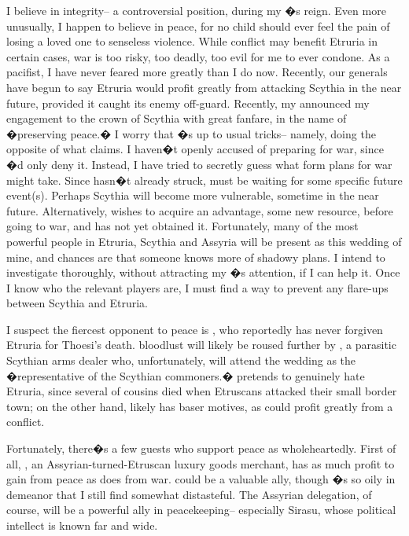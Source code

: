 \documentclass[char]{Kos}
\begin{document}
I believe in integrity-- a controversial position, during my \cEtruriaKing{\parent}�s reign. Even more unusually, I happen to believe in peace, for no child should ever feel the pain of losing a loved one to senseless violence. While conflict may benefit Etruria in certain cases, war is too risky, too deadly, too evil for me to ever condone. As a pacifist, I have never feared more greatly than I do now. Recently, our generals have begun to say Etruria would profit greatly from attacking Scythia in the near future, provided it caught its enemy off-guard. Recently, my \cEtruriaKing{\parent} announced my engagement to the crown \cBride{\prince} of Scythia with great fanfare, in the name of �preserving peace.� I worry that \cEtruriaKing{\Parent}�s up to \cEtruriaKing{\their} usual tricks-- namely, doing the opposite of what \cEtruriaKing{\they} claims. I haven�t openly accused \cEtruriaKing{\them} of preparing for war, since \cEtruriaKing{\they}�d only deny it. Instead, I have tried to secretly guess what form \cEtruriaKing{\their} plans for war might take. Since \cEtruriaKing{\they} hasn�t already struck, \cEtruriaKing{\They} must be waiting for some specific future event(s). Perhaps Scythia will become more vulnerable, sometime in the near future. Alternatively, \cEtruriaKing{\they} wishes to acquire an advantage, some new resource, before going to war, and \cEtruriaKing{\they} has not yet obtained it. Fortunately, many of the most powerful people in Etruria, Scythia and Assyria will be present as this wedding of mine, and chances are that someone knows more of \cEtruriaKing{\their} shadowy plans. I intend to investigate thoroughly, without attracting my \cEtruriaKing{\parent}�s attention, if I can help it. Once I know who the relevant players are, I must find a way to prevent any flare-ups between Scythia and Etruria.

I suspect the fiercest opponent to peace is \cScythiaQueen{\Monarch} \cScythiaQueen{\nickname}, who reportedly has never forgiven Etruria for Thoesi's death. \cScythiaQueen{\Their} bloodlust will likely be roused further by \cArmsDealer{}, a parasitic Scythian arms dealer who, unfortunately, will attend the wedding as the �representative of the Scythian commoners.� \cArmsDealer{\They} pretends to genuinely hate Etruria, since several of \cArmsDealer{\their} cousins died when Etruscans attacked their small border town; on the other hand, \cArmsDealer{\they} likely has baser motives, as \cArmsDealer{\they} could profit greatly from a conflict. 

Fortunately, there�s a few guests who support peace as wholeheartedly. First of all, \cMerchant{}, an Assyrian-turned-Etruscan luxury goods merchant, has as much profit to gain from peace as \cArmsDealer{\nickname} does from war. \cMerchant{\nickname} could be a valuable ally, though \cMerchant{\they}�s so oily in \cMerchant{\their} demeanor that I still find \cMerchant{\them} somewhat distasteful. The Assyrian delegation, of course, will be a powerful ally in peacekeeping-- especially Sirasu, whose political intellect is known far and wide.
\end{document}
